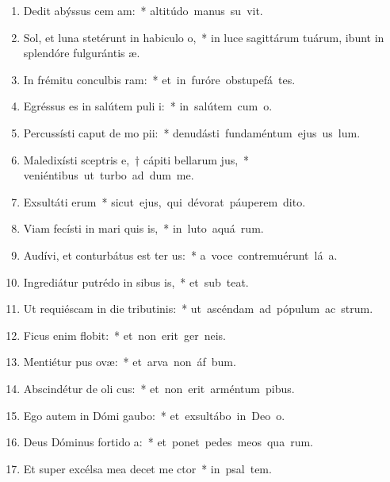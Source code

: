 \begin{flushleft}
\begin{enumerate}[leftmargin=*]
\item Dedit abýssus cem am:~* \mbox{altitúdo manus su vit.}
\item Sol, et luna stetérunt in habiculo o,~* in luce sagittárum tuárum, ibunt in splendóre fulgurántis  æ.
\item In frémitu conculbis ram:~* \mbox{et in furóre obstupefá tes.}
\item Egréssus es in salútem puli i:~* \mbox{in salútem cum  o.}
\item Percussísti caput de mo pii:~* \mbox{denudásti fundaméntum ejus us  lum.}
\item Maledixísti sceptris e,~† cápiti bellarum jus,~* \mbox{veniéntibus ut turbo ad dum me.}
\item Exsultáti erum~* \mbox{sicut ejus, qui dévorat páuperem  dito.}
\item Viam fecísti in mari quis is,~* \mbox{in luto aquá rum.}
\item Audívi, et conturbátus est ter us:~* \mbox{a voce contremuérunt lá a.}
\item Ingrediátur putrédo in sibus is,~* \mbox{et sub  teat.}
\item Ut requiéscam in die tributinis:~* \mbox{ut ascéndam ad pópulum ac strum.}
\item Ficus enim  flobit:~* \mbox{et non erit ger  neis.}
\item Mentiétur pus ovæ:~* \mbox{et arva non áf bum.}
\item Abscindétur de oli cus:~* \mbox{et non erit arméntum  pibus.}
\item Ego autem in Dómi gaubo:~* \mbox{et exsultábo in Deo  o.}
\item Deus Dóminus fortido a:~* \mbox{et ponet pedes meos qua rum.}
\item Et super excélsa mea decet me ctor~* \mbox{in psal tem.}

\end{enumerate}
\end{flushleft}

